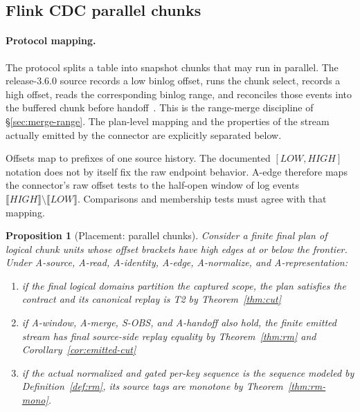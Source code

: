\documentclass[sigconf,nonacm,10pt]{acmart}
\theoremstyle{plain}
\newtheorem{proposition}{Proposition}
\theoremstyle{definition}
\newcommand{\den}[1]{\llbracket #1 \rrbracket}   %
\begin{document}
\subsection{Flink CDC parallel chunks}\label{sec:inst-parallel}

\paragraph{Protocol mapping.}
The protocol splits a table into snapshot chunks that may run in
parallel. The release-3.6.0 source records a low binlog offset, runs the
chunk select, records a high offset, reads the corresponding binlog
range, and reconciles those events into the buffered chunk before
handoff~\cite{flinkcdc_mysql,flinkcdc_source_code}. This is the
range-merge discipline of \S\ref{sec:merge-range}. The plan-level
mapping and the properties of the stream actually emitted by the
connector are explicitly separated below.

Offsets map to prefixes of one source history. The documented
$[\mathit{LOW},\mathit{HIGH}]$ notation does not by itself fix the raw
endpoint behavior. A-edge therefore maps the connector's raw offset
tests to the half-open window of log events
$\den{\mathit{HIGH}}\setminus\den{\mathit{LOW}}$. Comparisons and
membership tests must agree with that mapping.

\begin{proposition}[Placement: parallel chunks]\label{prop:parallel}
Consider a finite final plan of logical chunk units whose offset
brackets have high edges at or below the frontier. Under A-source,
A-read, A-identity, A-edge, A-normalize, and A-representation:
\begin{enumerate}
\item if the final logical domains partition the captured scope, the
plan satisfies the contract and its canonical replay is T2 by
Theorem~\ref{thm:cut}
\item if A-window, A-merge, S-OBS, and A-handoff also hold, the finite
emitted stream has final source-side replay equality by
Theorem~\ref{thm:rm} and Corollary~\ref{cor:emitted-cut}
\item if the actual normalized and gated per-key sequence is the
sequence modeled by Definition~\ref{def:rm}, its source tags are
monotone by Theorem~\ref{thm:rm-mono}.
\end{enumerate}
\end{proposition}
\end{document}
